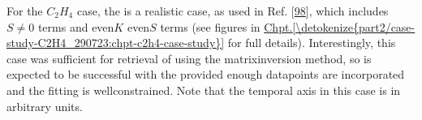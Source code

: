 \documentclass[letterpaper,table,10pt,english]{jupyterBook}
\begin{document}
\sphinxAtStartPar
For the \(C_2H_4\) case, the {\hyperref[\detokenize{backmatter/glossary:term-RWP}]{}} is a realistic case, as used in Ref. {[}\hyperlink{cite.backmatter/bibliography:id635}{98}{]}, which includes \(S\neq0\) terms and even\sphinxhyphen{}\(K\) even\sphinxhyphen{}\(S\) terms (see figures in \hyperref[\detokenize{part2/case-study-C2H4_290723:chpt-c2h4-case-study}]{Chpt.\@ \ref{\detokenize{part2/case-study-C2H4_290723:chpt-c2h4-case-study}}} for full details). Interestingly, this case was sufficient for retrieval of {\hyperref[\detokenize{backmatter/glossary:term-MF}]{}} using the matrix\sphinxhyphen{}inversion method, so is expected to be successful with the {\hyperref[\detokenize{backmatter/glossary:term-bootstrap-retrieval-protocol}]{}} provided enough data\sphinxhyphen{}points are incorporated and the fitting is well\sphinxhyphen{}constrained. Note that the temporal axis in this case is in arbitrary units.
\end{document}
